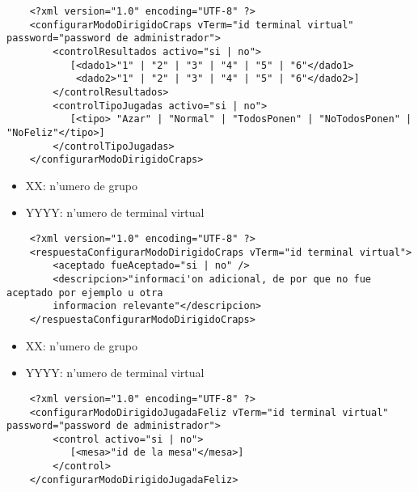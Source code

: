\begin{verbatim}
    <?xml version="1.0" encoding="UTF-8" ?>
    <configurarModoDirigidoCraps vTerm="id terminal virtual" password="password de administrador">
        <controlResultados activo="si | no">
           [<dado1>"1" | "2" | "3" | "4" | "5" | "6"</dado1>
            <dado2>"1" | "2" | "3" | "4" | "5" | "6"</dado2>]
        </controlResultados>
        <controlTipoJugadas activo="si | no">
           [<tipo> "Azar" | "Normal" | "TodosPonen" | "NoTodosPonen" | "NoFeliz"</tipo>]
        </controlTipoJugadas>
    </configurarModoDirigidoCraps>
\end{verbatim}


 
\begin{itemize}
    \item{XX: n'umero de grupo}
    \item{YYYY: n'umero de terminal virtual}
\end{itemize}

\begin{verbatim}
    <?xml version="1.0" encoding="UTF-8" ?>
    <respuestaConfigurarModoDirigidoCraps vTerm="id terminal virtual">
        <aceptado fueAceptado="si | no" />
        <descripcion>"informaci'on adicional, de por que no fue aceptado por ejemplo u otra
        informacion relevante"</descripcion>
    </respuestaConfigurarModoDirigidoCraps>
\end{verbatim}


 
\begin{itemize}
    \item{XX: n'umero de grupo}
    \item{YYYY: n'umero de terminal virtual}
\end{itemize}


\begin{verbatim}
    <?xml version="1.0" encoding="UTF-8" ?>
    <configurarModoDirigidoJugadaFeliz vTerm="id terminal virtual" password="password de administrador">
        <control activo="si | no">
           [<mesa>"id de la mesa"</mesa>]
        </control>
    </configurarModoDirigidoJugadaFeliz>
\end{verbatim}


